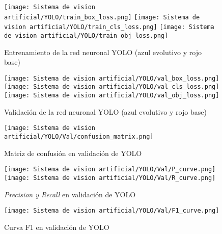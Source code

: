 \begin{figure}[H]
	\centering
    \texttt{[image: Sistema de vision artificial/YOLO/train\_box\_loss.png]} \hfill
    \texttt{[image: Sistema de vision artificial/YOLO/train\_cls\_loss.png]} \hfill
    \texttt{[image: Sistema de vision artificial/YOLO/train\_obj\_loss.png]}
	\caption[Entrenamiento de la red neuronal YOLO \textit{(bounding box loss, class loss \& object loss)}]{Entrenamiento de la red neuronal YOLO (azul evolutivo y rojo base)}
	\label{chap:Sistema de visión artificial fig:YOLO train}
\end{figure}

\begin{figure}[H]
	\centering
    \texttt{[image: Sistema de vision artificial/YOLO/val\_box\_loss.png]} \hfill
    \texttt{[image: Sistema de vision artificial/YOLO/val\_cls\_loss.png]} \hfill
    \texttt{[image: Sistema de vision artificial/YOLO/val\_obj\_loss.png]}
	\caption[Validación de la red neuronal YOLO \textit{(bounding box loss, class loss \& object loss)}]{Validación de la red neuronal YOLO (azul evolutivo y rojo base)}
	\label{chap:Sistema de visión artificial fig:YOLO validation}
\end{figure}

\begin{figure}[H]
	\centering
	\texttt{[image: Sistema de vision artificial/YOLO/Val/confusion\_matrix.png]}
	\caption{Matriz de confusión en validación de YOLO}
	\label{chap:Sistema de visión artificial fig:YOLO Val Matrix}
\end{figure}

\begin{figure}[H]
	\centering
    \texttt{[image: Sistema de vision artificial/YOLO/Val/P\_curve.png]} \hfill
    \texttt{[image: Sistema de vision artificial/YOLO/Val/R\_curve.png]}
	\caption{\textit{Precision y Recall} en validación de YOLO}
	\label{chap:Sistema de visión artificial fig:YOLO Val PR}
\end{figure}

\begin{figure}[H]
	\centering
	\texttt{[image: Sistema de vision artificial/YOLO/Val/F1\_curve.png]}
	\caption{Curva F1 en validación de YOLO}
	\label{chap:Sistema de visión artificial fig:YOLO Val F1}
\end{figure}

